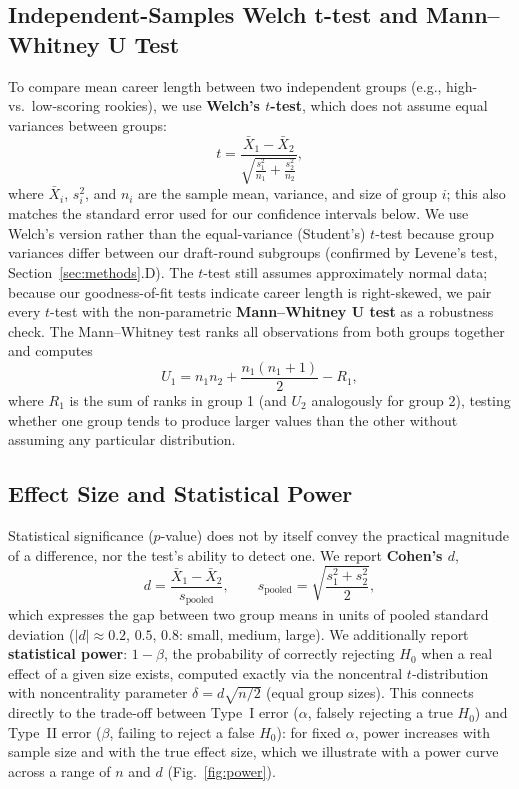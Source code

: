 \documentclass[10pt,twocolumn]{article}
\begin{document}
\subsection{Independent-Samples Welch t-test and Mann--Whitney U Test}
To compare mean career length between two independent groups (e.g.,
high- vs.\ low-scoring rookies), we use \textbf{Welch's $t$-test},
which does not assume equal variances between groups:
\[
  t = \frac{\bar{X}_1 - \bar{X}_2}
           {\sqrt{\tfrac{s_1^2}{n_1} + \tfrac{s_2^2}{n_2}}},
\]
where $\bar{X}_i$, $s_i^2$, and $n_i$ are the sample mean, variance, and
size of group $i$; this also matches the standard error used for our
confidence intervals below. We use Welch's version rather than the
equal-variance (Student's) $t$-test because group variances differ
between our draft-round subgroups (confirmed by Levene's test,
Section~\ref{sec:methods}.D). The $t$-test still assumes approximately
normal data; because our goodness-of-fit tests indicate career length
is right-skewed, we pair every $t$-test with the non-parametric
\textbf{Mann--Whitney U test} as a robustness check. The Mann--Whitney
test ranks all observations from both groups together and computes
\[
  U_1 = n_1 n_2 + \frac{n_1(n_1+1)}{2} - R_1,
\]
where $R_1$ is the sum of ranks in group 1 (and $U_2$ analogously for
group 2), testing whether one group tends to produce larger values than
the other without assuming any particular distribution.

\subsection{Effect Size and Statistical Power}
Statistical significance ($p$-value) does not by itself convey the
practical magnitude of a difference, nor the test's ability to detect
one. We report \textbf{Cohen's $d$},
\[
  d = \frac{\bar{X}_1 - \bar{X}_2}{s_{\text{pooled}}}, \qquad
  s_{\text{pooled}} = \sqrt{\frac{s_1^2 + s_2^2}{2}},
\]
which expresses the gap between two group means in units of pooled
standard deviation ($|d|\approx 0.2$, $0.5$, $0.8$: small, medium,
large). We additionally report \textbf{statistical power}: $1-\beta$,
the probability of correctly rejecting $H_0$ when a real effect of a
given size exists, computed exactly via the noncentral $t$-distribution
with noncentrality parameter $\delta = d\sqrt{n/2}$ (equal group
sizes). This connects directly to the trade-off between Type~I error
($\alpha$, falsely rejecting a true $H_0$) and Type~II error ($\beta$,
failing to reject a false $H_0$): for fixed $\alpha$, power increases
with sample size and with the true effect size, which we illustrate
with a power curve across a range of $n$ and $d$ (Fig.~\ref{fig:power}).
\end{document}
